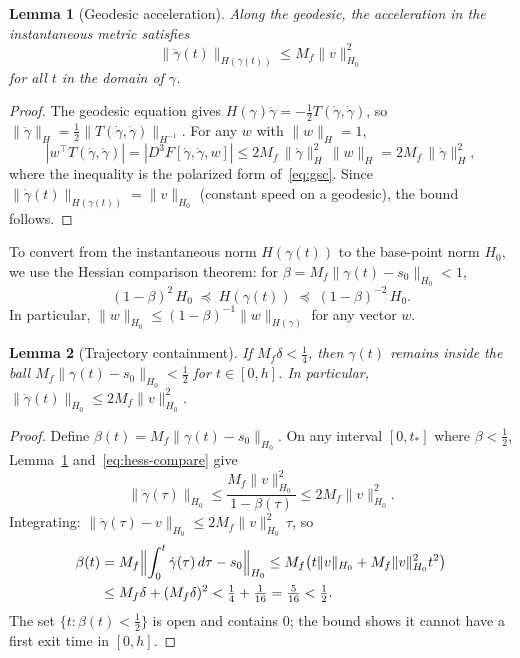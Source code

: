\documentclass[11pt]{article}
\newtheorem{lemma}{Lemma}
\begin{document}
\begin{lemma}[Geodesic acceleration]\label{lem:accel}
Along the geodesic, the acceleration in the instantaneous metric
satisfies
\begin{equation}\label{eq:accel-bound}
  \|\ddot\gamma(t)\|_{H(\gamma(t))} \leq M_f \|v\|_{H_0}^2
\end{equation}
for all $t$ in the domain of $\gamma$.
\end{lemma}
\begin{proof}
The geodesic equation gives $H(\gamma)\ddot\gamma
= -\frac{1}{2}T(\dot\gamma,\dot\gamma)$, so
$\|\ddot\gamma\|_H = \frac{1}{2}\|T(\dot\gamma,\dot\gamma)\|_{H^{-1}}$.
For any $w$ with $\|w\|_H = 1$,
\[
  |w^\top T(\dot\gamma,\dot\gamma)|
  = |D^3 F[\dot\gamma, \dot\gamma, w]|
  \leq 2M_f\,\|\dot\gamma\|_H^2\,\|w\|_H
  = 2M_f\,\|\dot\gamma\|_H^2,
\]
where the inequality is the polarized form
of~\eqref{eq:gsc}.  Since $\|\dot\gamma(t)\|_{H(\gamma(t))}
= \|v\|_{H_0}$ (constant speed on a geodesic), the bound follows.
\end{proof}

To convert from the instantaneous norm $H(\gamma(t))$ to the
base-point norm $H_0$, we use the Hessian comparison theorem:
for $\beta = M_f\|\gamma(t) - s_0\|_{H_0} < 1$,
\begin{equation}\label{eq:hess-compare}
  (1-\beta)^2\, H_0 \;\preceq\; H(\gamma(t)) \;\preceq\;
  (1-\beta)^{-2}\, H_0.
\end{equation}
In particular, $\|w\|_{H_0} \leq (1-\beta)^{-1}\|w\|_{H(\gamma)}$
for any vector $w$.

\begin{lemma}[Trajectory containment]\label{lem:contain}
If $M_f\delta < \frac{1}{4}$, then $\gamma(t)$ remains inside the
ball $M_f\|\gamma(t) - s_0\|_{H_0} < \frac{1}{2}$ for $t \in [0, h]$.
In particular, $\|\ddot\gamma(t)\|_{H_0} \leq 2M_f\|v\|_{H_0}^2$.
\end{lemma}
\begin{proof}
Define $\beta(t) = M_f\|\gamma(t) - s_0\|_{H_0}$.  On any interval
$[0, t_*]$ where $\beta < \frac{1}{2}$,
Lemma~\ref{lem:accel} and~\eqref{eq:hess-compare} give
\[
  \|\ddot\gamma(\tau)\|_{H_0}
  \leq \frac{M_f\|v\|_{H_0}^2}{1-\beta(\tau)}
  \leq 2M_f\|v\|_{H_0}^2.
\]
Integrating: $\|\dot\gamma(\tau) - v\|_{H_0}
\leq 2M_f\|v\|_{H_0}^2\,\tau$, so
\begin{align*}
  \beta(t)
  &= M_f\Bigl\|\int_0^t \dot\gamma(\tau)\,d\tau - s_0\Bigr\|_{H_0}
  \leq M_f\bigl(t\|v\|_{H_0} + M_f\|v\|_{H_0}^2 t^2\bigr) \\
  &\leq M_f\delta + (M_f\delta)^2
  < \tfrac{1}{4} + \tfrac{1}{16}
  = \tfrac{5}{16} < \tfrac{1}{2}.
\end{align*}
The set $\{t : \beta(t) < \frac{1}{2}\}$ is open and contains $0$;
the bound shows it cannot have a first exit time in $[0,h]$.
\end{proof}
\end{document}
